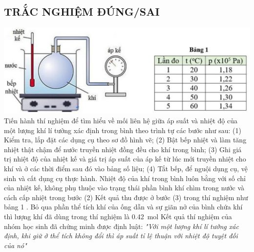 \subsection{TRẮC NGHIỆM ĐÚNG/SAI}
\setcounter{ex}{0}
\begin{ex}
	{\includegraphics[scale=0.4]{figs/G12Y24B11-1}}
	Tiến hành thí nghiệm để tìm hiểu về mối liên hệ giữa áp suất và nhiệt độ của một lượng khí lí tưởng xác định trong bình theo trình tự các bước như sau: (1) Kiểm tra, lắp đặt các dụng cụ theo sơ đồ hình vẽ; (2) Bật bếp nhiệt và làm tăng nhiệt thật chậm để nước truyền nhiệt đồng đều cho khí trong bình; (3) Ghi giá trị nhiệt độ của nhiệt kế và giá trị áp suất của áp kế từ lúc mới truyền nhiệt cho khí và ở các thời điểm sau đó vào bảng số liệu; (4) Tắt bếp, để nguội dụng cụ, vệ sinh và cất dụng cụ thực hành.
	{Nhiệt độ của khí trong bình luôn bằng với số chỉ của nhiệt kế, không phụ thuộc vào trạng thái phần bình khí chìm trong nước và cách cấp nhiệt trong bước (2)}
	{Kết quả thu được ở bước (3) trong thí nghiệm như bảng 1 . Bỏ qua phần thể tích khí của ống dẫn và sự giãn nở của bình chứa khí thì lượng khí đã dùng trong thí nghiệm là \SI{0.42}{\mole}}
	{Kết quả thí nghiệm của nhóm học sinh đã chứng minh được định luật: \textit{"Với một lượng khí lí tưởng xác định, khi giữ ở thể tích không đổi thì áp suất tỉ lệ thuận với nhiệt độ tuyệt đối của nó"}}
	\loigiai{}
\end{ex}

